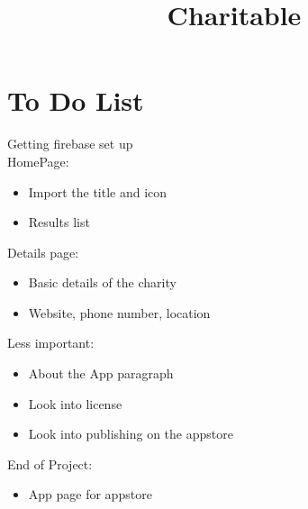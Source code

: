 \documentclass{article}
\title{Charitable}
\begin{document}
\maketitle

\section{To Do List}
Getting firebase set up\\
HomePage: 
\begin{itemize}
    \item Import the title and icon
    \item Results list
\end{itemize}
Details page:
\begin{itemize}
    \item Basic details of the charity
    \item Website, phone number, location
\end{itemize}
Less important: 
\begin{itemize}
    \item About the App paragraph
    \item Look into license
    \item Look into publishing on the appstore
\end{itemize}
End of Project:
\begin{itemize}
    \item App page for appstore
\end{itemize}
\end{document}
